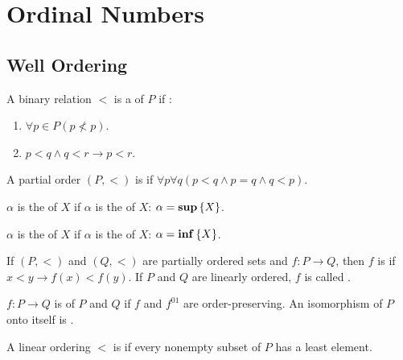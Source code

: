 \section{Ordinal Numbers}

\subsection{Well Ordering}
\begin{definition}
    A binary relation $<$ is a  of $P$ if :
    \begin{enumerate}
        \item $\forall p \in P (p \nless p)$.
        \item $p < q \wedge q < r \rightarrow p < r$.
    \end{enumerate}
\end{definition}

\begin{definition}
    A partial order $(P, <)$ is  if $\forall p \forall q (p < q \wedge p = q \wedge q < p )$.
\end{definition}


\begin{definition}
    $\alpha$ is the  of $X$ if $\alpha$ is the  of $X$: $\alpha = \mathbf{sup} \set{X}$.
\end{definition}

\begin{definition}
    $\alpha$ is the  of $X$ if $\alpha$ is the  of $X$: $\alpha = \mathbf{inf} \set{X}$.
\end{definition}


\begin{definition}
    If $(P, <)$ and $(Q,<)$ are partially ordered sets and $f: P \rightarrow Q$, then $f$ is  if $x < y \rightarrow f(x) < f(y)$. If $P$ and $Q$ are linearly ordered, $f$ is called .
\end{definition}

\begin{definition}
    $f: P \rightarrow Q$  is  of $P$ and $Q$ if $f$ and $f^{01}$ are order-preserving. An isomorphism of $P$ onto itself is .
\end{definition}


\begin{definition}
    A linear ordering $<$ is  if every nonempty subset of $P$ has a least element.
\end{definition}

